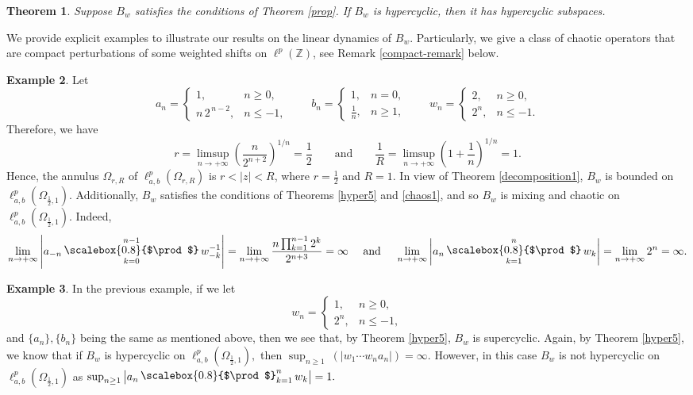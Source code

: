 \documentclass[12pt, reqno]{amsart}
\DeclareMathOperator*{\Mprod}{\text{\raisebox{0.25ex}{\scalebox{0.8}{$\prod$}}}}
\newtheorem{theorem}{Theorem}[section]
\theoremstyle{definition}
\newtheorem{example}[theorem]{Example}
\theoremstyle{remark}
\numberwithin{equation}{section}
\begin{document}
\begin{theorem}
    Suppose $B_w$ satisfies the conditions of Theorem \ref{prop}. If $B_w$ is hypercyclic, then it has hypercyclic subspaces.
\end{theorem}

We provide explicit examples to illustrate our results on the linear dynamics of $B_w$. Particularly, we give a class of chaotic operators that are compact perturbations of some weighted  shifts on $\ell^p(\mathbb{Z})$, see Remark \ref{compact-remark} below.

 \begin{example}
 Let
 \[
a_n =
\begin{cases}
1, & n \ge 0,\\[4pt]
n\,2^{\,n-2}, & n \le -1,
\end{cases}
\qquad
b_n =
\begin{cases}
1, & n = 0,\\[4pt]
\frac{1}{n}, & n \ge 1,
\end{cases}
\qquad
w_n =
\begin{cases}
2, & n \ge 0,\\[4pt]
2^{n}, & n \le -1.
\end{cases}
\]
 Therefore, we have 
 \[
 r=\limsup_{n\rightarrow +\infty}\left(\frac{n}{2^{n+2}}\right)^{1/n}=\frac{1}{2}\qquad \text{and}\qquad\frac{1}{R}=\limsup_{n\rightarrow +\infty}\left(1+\frac{1}{n}\right)^{1/n}=1.
 \]
 Hence, the annulus $\Omega_{r,R}$ of $\ell^p_{a,b}(\Omega_{r,R})$ is $r<|z|<R$, where $r=\frac{1}{2}$ and $R=1.$ In view of Theorem \ref{decomposition1}, $B_{w}$ is bounded on $\ell^p_{a,b}(\Omega_{\frac{1}{2},1}).$ Additionally, $B_w$ satisfies the conditions of Theorems \ref{hyper5} and \ref{chaos1}, and so $B_{w}$ is mixing and chaotic on $\ell^p_{a,b}(\Omega_{\frac{1}{2},1}).$  Indeed,
    \[
    \lim_{n\rightarrow +\infty}\left\lvert a_{-n}\Mprod_{k=0}^{n-1} w_{-k}^{-1}
 \right\rvert=\lim_{n\rightarrow +\infty}\frac{n\prod_{k=1}^{n-1}2^{k}}{2^{n+3}}=\infty ~~~~\text{and}~~~~ \lim_{n\rightarrow +\infty} \left\lvert a_{n}\Mprod_{k=1}^{n} w_{k} \right\rvert=\lim_{n\to+\infty} 2^{n}=\infty.
    \]
    \end{example}
    \begin{example}
    In the previous example, if we let 
    \[
w_n =
\begin{cases}
1, & n \ge 0,\\[4pt]
2^{n}, & n \le -1,
\end{cases}
\]
 and $\{a_{n}\}, \{b_{n}\}$ being the same as mentioned above, then we see that, by Theorem \ref{hyper5}, $B_{w}$ is supercyclic. Again, by Theorem \ref{hyper5}, we know that if $B_{w}$ is hypercyclic on $\ell^p_{a,b}(\Omega_{\frac{1}{2},1}),$ then  $\sup_{n\geq 1}~(|w_{1}\cdots w_{n}a_{n}|)=\infty$.  However, in this case  $B_{w}$ is not hypercyclic on $\ell^p_{a,b}(\Omega_{\frac{1}{2},1})$ as
   $
    \sup_{n\geq 1} \left\lvert a_{n}\Mprod_{k=1}^{n}w_{k} \right\rvert=1.
    $
\end{example}
\end{document}
